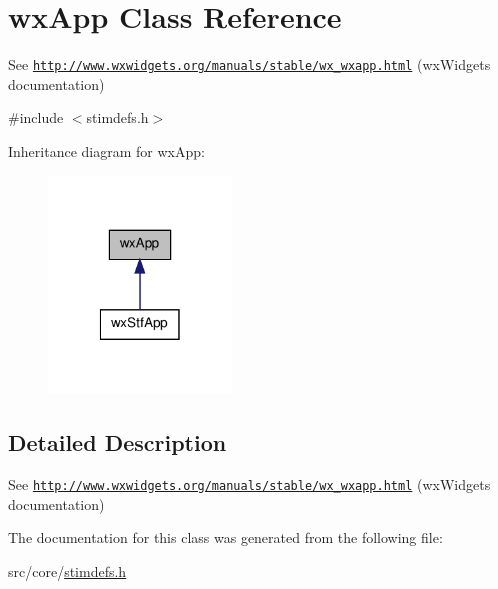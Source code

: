 \hypertarget{classwxApp}{
\section{wxApp Class Reference}
\label{classwxApp}
}


See \href{http://www.wxwidgets.org/manuals/stable/wx_wxapp.html}{\tt http://www.wxwidgets.org/manuals/stable/wx\_\-wxapp.html} (wxWidgets documentation)  




{\ttfamily \#include $<$stimdefs.h$>$}



Inheritance diagram for wxApp:
\nopagebreak
\begin{figure}[H]
\begin{center}
\leavevmode
\includegraphics[width=138pt]{classwxApp__inherit__graph}
\end{center}
\end{figure}


\subsection{Detailed Description}
See \href{http://www.wxwidgets.org/manuals/stable/wx_wxapp.html}{\tt http://www.wxwidgets.org/manuals/stable/wx\_\-wxapp.html} (wxWidgets documentation) 

The documentation for this class was generated from the following file:\begin{DoxyCompactItemize}
\item 
src/core/\hyperlink{stimdefs_8h}{stimdefs.h}\end{DoxyCompactItemize}
